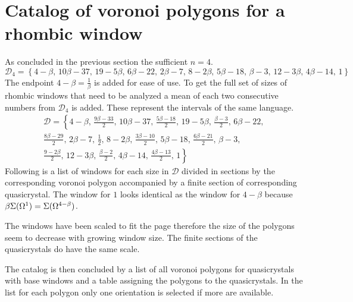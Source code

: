 \documentclass[text.tex]{subfiles}
\begin{document}
\section{Catalog of voronoi polygons for a rhombic window}
As concluded in the previous section the sufficient $n=4$. 
$$\mathcal{D}_4 = \left\{4-\beta,\, 10\beta-37,\, 19-5\beta,\, 6\beta-22,\, 2\beta-7,\, 8-2\beta,\, 5\beta-18,\, \beta-3,\, 12-3\beta,\, 4\beta-14,\, 1\right\}$$
The endpoint $4-\beta = \frac{1}{\beta}$ is added for ease of use. To get the full set of sizes of rhombic windows that need to be analyzed a mean of each two consecutive numbers from $\mathcal{D}_4$ is added. These represent the intervals of the same language. 
\begin{multline*}
\mathcal{D} = \left\{4-\beta,\, \frac{9\beta-33}{2},\, 10\beta-37,\, \frac{5\beta-18}{2},\, 19-5\beta,\, \frac{\beta-3}{2},\, 6\beta-22,\, \right. \\
\frac{8\beta-29}{2},\, 2\beta-7,\, \frac{1}{2},\, 8-2\beta,\, \frac{3\beta-10}{2},\,  5\beta-18,\, \frac{6\beta-21}{2},\, \beta-3,\, \\
\left. \frac{9-2\beta}{2},\, 12-3\beta,\, \frac{\beta-2}{2},\, 4\beta-14,\, \frac{4\beta-13}{2},\, 1\right\}
\end{multline*}
Following is a list of windows for each size in $\mathcal{D}$ divided in sections by the corresponding voronoi polygon accompanied by a finite section of corresponding quasicrystal. The window for $1$ looks identical as the window for $4-\beta$ because $\beta\Sigma(\Omega^1)=\Sigma(\Omega^{4-\beta})$.

The windows have been scaled to fit the page therefore the size of the polygons seem to decrease with growing window size. The finite sections of the quasicrystals do have the same scale.

The catalog is then concluded by a list of all voronoi polygons for quasicrystals with base windows and a table assigning the polygons to the quasicrystals. In the list for each polygon only one orientation is selected if more are available. 
\end{document}
